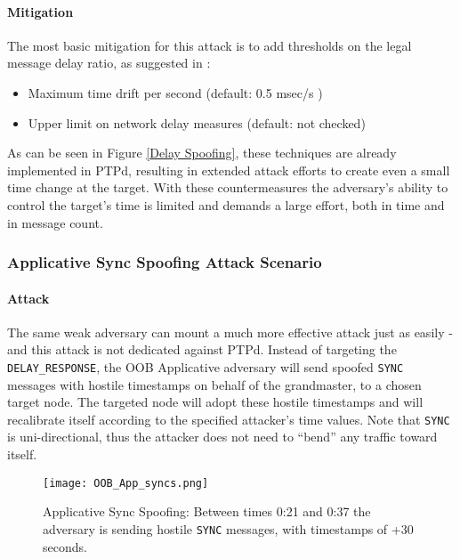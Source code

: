 \documentclass[11pt]{article}
\begin{document}
\paragraph{Mitigation}\label{time:scenario1mit}

The most basic mitigation for this attack is to add thresholds on the legal message delay ratio, as suggested in \cite{Delay_Filter_1}:

\begin{itemize}

  \item Maximum time drift per second (default: 0.5 msec/s )

  \item Upper limit on network delay measures (default: not checked)

\end{itemize}

As can be seen in Figure \ref{Delay Spoofing}, these techniques are already implemented in PTPd, resulting in extended attack efforts to create even a small time change at the target. With these countermeasures the adversary's ability to control the target's time is limited and demands a large effort, both in time and in message count.



\subsubsection{Applicative Sync Spoofing Attack Scenario}\label{time:scenrio2}

\paragraph{Attack}

The same weak adversary can mount a much more effective attack just as easily - and this attack is not dedicated against PTPd. Instead of targeting the \texttt{DELAY_RESPONSE}, the OOB Applicative adversary will send spoofed \texttt{SYNC} messages with hostile timestamps on behalf of the grandmaster, to a chosen target node. The targeted node will adopt these hostile timestamps and will recalibrate itself according to the specified attacker's time values. Note that \texttt{SYNC} is uni-directional, thus the attacker does not need to ``bend'' any traffic toward itself.



\begin{figure}[t]

\centerline{\texttt{[image: OOB\_App\_syncs.png]}}

\caption{Applicative Sync Spoofing: Between times 0:21 and 0:37 the adversary is sending hostile \texttt{SYNC} messages, with timestamps of +30 seconds.}

\label{App Syncs}

\end{figure}
\end{document}
